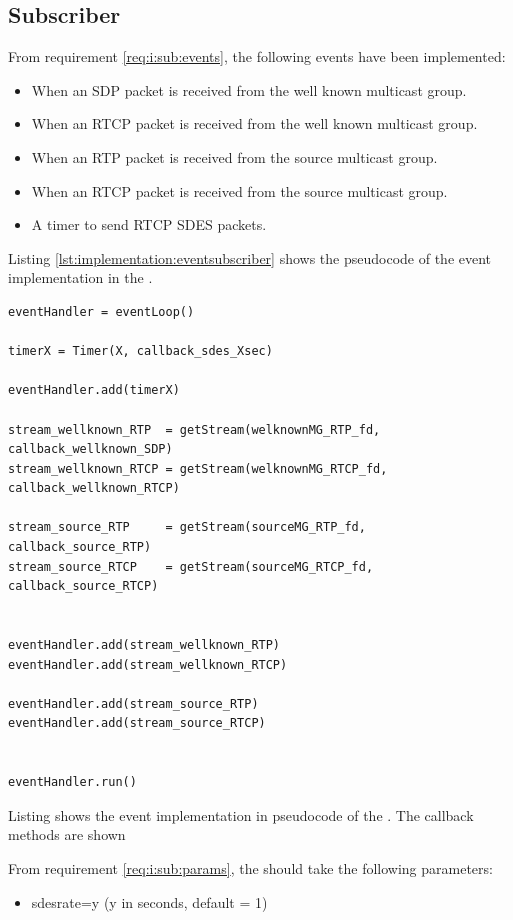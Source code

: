 \subsection{Subscriber}
From requirement \ref{req:i:sub:events}, the following events have been implemented:
\begin{itemize}
	\item When an SDP packet is received from the well known multicast group.
	\item When an RTCP packet is received from the well known multicast group.
	\item When an RTP packet is received from the source multicast group.
	\item When an RTCP packet is received from the source multicast group.
	\item A timer to send RTCP SDES packets.
\end{itemize}


Listing \ref{lst:implementation:eventsubscriber} shows the pseudocode of the event implementation in the \sub{}.
\begin{listing}[H] 
\begin{verbatim}
eventHandler = eventLoop()
	
timerX = Timer(X, callback_sdes_Xsec)
	
eventHandler.add(timerX)
	
stream_wellknown_RTP  = getStream(welknownMG_RTP_fd, callback_wellknown_SDP)
stream_wellknown_RTCP = getStream(welknownMG_RTCP_fd, callback_wellknown_RTCP)

stream_source_RTP     = getStream(sourceMG_RTP_fd, callback_source_RTP)
stream_source_RTCP    = getStream(sourceMG_RTCP_fd, callback_source_RTCP)


eventHandler.add(stream_wellknown_RTP)
eventHandler.add(stream_wellknown_RTCP)

eventHandler.add(stream_source_RTP)
eventHandler.add(stream_source_RTCP)

	
eventHandler.run()
\end{verbatim}
\caption{Listing shows the event implementation in pseudocode of the \pub{}. The callback methods are shown}
\label{lst:implementation:eventsubscriber}
\end{listing}

From requirement \ref{req:i:sub:params}, the \sub{} should take the following parameters:

\begin{itemize}
	\item sdesrate=y (y in seconds, default = 1)
\end{itemize}


